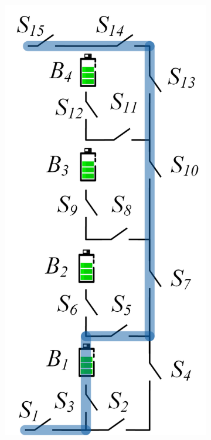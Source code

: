 \documentclass{article}
\begin{document}
\begin{figure}[htbp]
    \centering
    \begin{subfigure}[b]{0.2\textwidth}
        \includegraphics[width=\textwidth]{e4-mac.png}

\end{subfigure}
\end{figure}
\end{document}
